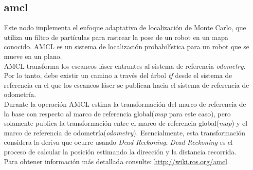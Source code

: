 \documentclass[a4paper,usenames,dvipsnames,svgnames,table]{book}
\begin{document}
\subsection{amcl}

Este nodo implementa el enfoque adaptativo de localización de Monte Carlo, que utiliza un filtro de partículas para rastrear la pose de un robot en un mapa conocido. AMCL es un sistema de localización probabilística para un robot que se mueve en un plano.\\

AMCL transforma los escaneos láser entrantes al sistema de referencia \textit{odometry}. Por lo tanto, debe existir un camino a través del árbol \textit{tf} desde el sistema de referencia en el que los escaneos láser se publican hacia el sistema de referencia de odometría.\\

Durante la operación AMCL estima la transformación del marco de referencia de la base con respecto al marco de referencia global(\textit{map} para este caso), pero solamente publica la transformación entre el marco de referencia global(\textit{map}) y el marco de referencia de odometría(\textit{odometry}). Esencialmente, esta transformación considera la deriva que ocurre usando \textit{Dead Reckoning}. \textit{Dead Reckoning} es el proceso de calcular la posición estimando la dirección y la distancia recorrida.\\

Para obtener información más detallada consulte: \url{http://wiki.ros.org/amcl}.
\end{document}
